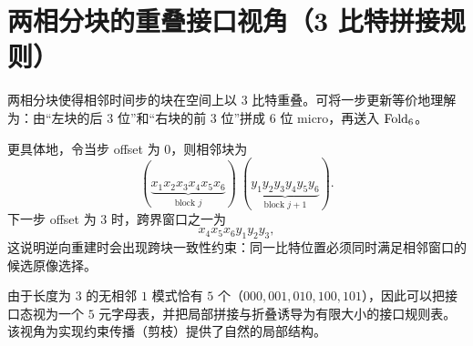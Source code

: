 
\section{两相分块的重叠接口视角（3 比特拼接规则）}

两相分块使得相邻时间步的块在空间上以 $3$ 比特重叠。可将一步更新等价地理解为：由“左块的后 $3$ 位”和“右块的前 $3$ 位”拼成 $6$ 位 micro，再送入 $\mathrm{Fold}_6$。

更具体地，令当步 offset 为 $0$，则相邻块为
$$
(\underbrace{x_1x_2x_3x_4x_5x_6}_{\text{block }j})\ (\underbrace{y_1y_2y_3y_4y_5y_6}_{\text{block }j+1}).
$$
下一步 offset 为 $3$ 时，跨界窗口之一为
$$
x_4x_5x_6y_1y_2y_3,
$$
这说明逆向重建时会出现跨块一致性约束：同一比特位置必须同时满足相邻窗口的候选原像选择。

由于长度为 $3$ 的无相邻 $1$ 模式恰有 $5$ 个（$000,001,010,100,101$），因此可以把接口态视为一个 $5$ 元字母表，并把局部拼接与折叠诱导为有限大小的接口规则表。该视角为实现约束传播（剪枝）提供了自然的局部结构。

